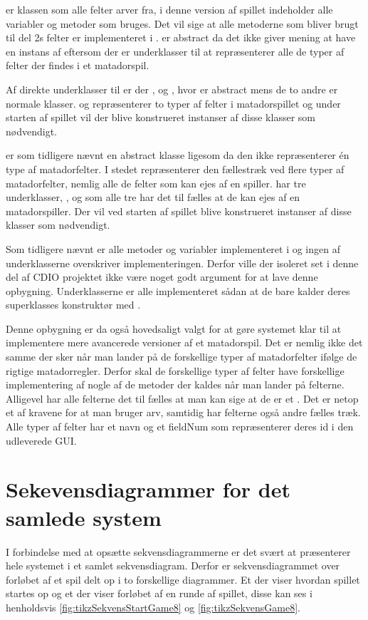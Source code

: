  er klassen som alle felter arver fra, i denne version af spillet indeholder  alle variabler og metoder som bruges. Det vil sige at alle metoderne som bliver brugt til del 2s felter er implementeret i .  er abstract da det ikke giver mening at have en instans af  eftersom der er underklasser til at repræsenterer alle de typer af felter der findes i et matadorspil.

Af direkte underklasser til  er der ,  og , hvor  er abstract mens de to andre er normale klasser.  og  repræsenterer to typer af felter i matadorspillet og under starten af spillet vil der blive konstrueret instanser af disse klasser som nødvendigt.

 er som tidligere nævnt en abstract klasse ligesom  da den ikke repræsenterer én type af matadorfelter. I stedet repræsenterer den fællestræk ved flere typer af matadorfelter, nemlig alle de felter som kan ejes af en spiller.  har tre underklasser, ,  og  som alle tre har det til fælles at de kan ejes af en matadorspiller. Der vil ved starten af spillet blive konstrueret instanser af disse klasser som nødvendigt.

Som tidligere nævnt er alle metoder og variabler implementeret i  og ingen af underklasserne overskriver implementeringen. Derfor ville der isoleret set i denne del af CDIO projektet ikke være noget godt argument for at lave denne opbygning. Underklasserne er alle implementeret sådan at de bare kalder deres superklasses konstruktør med .

Denne opbygning er da også hovedsaligt valgt for at gøre systemet klar til at implementere mere avancerede versioner af et matadorspil. Det er nemlig ikke det samme der sker når man lander på de forskellige typer af matadorfelter ifølge de rigtige matadorregler. Derfor skal de forskellige typer af felter have forskellige implementering af nogle af de metoder der kaldes når man lander på felterne. Alligevel har alle felterne det til fælles at man kan sige at de er et . Det er netop et af kravene for at man bruger arv, samtidig har felterne også andre fælles træk. Alle typer af felter har et navn og et fieldNum som repræsenterer deres id i den udleverede GUI.

\section{Sekevensdiagrammer for det samlede system}
I forbindelse med at opsætte sekvensdiagrammerne er det svært at præsenterer hele systemet i et samlet sekvensdiagram. Derfor er sekvensdiagrammet over forløbet af et spil delt op i to forskellige diagrammer. Et der viser hvordan spillet startes op og et der viser forløbet af en runde af spillet, disse kan ses i henholdsvis \vref{fig:tikzSekvensStartGame8} og \vref{fig:tikzSekvensGame8}.

